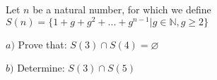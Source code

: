 Let $n$ be a natural number, for which we define $S(n)=\{1+g+g^2+...+g^{n-1}|g\in{\mathbb{N}},g\geq2\}$

$a)$ Prove that: $S(3)\cap S(4)=\varnothing$

$b)$ Determine: $S(3)\cap S(5)$